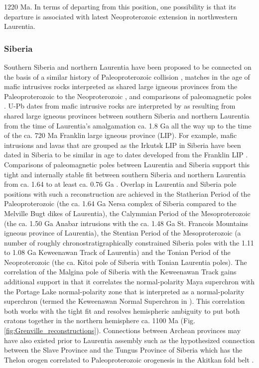 \documentclass[twocolumn, switch]{article} %
\begin{document}
1220 Ma. In terms of departing from this position, one possibility is that its departure is associated with latest Neoproterozoic extension in northwestern Laurentia.

\subsubsection{Siberia}

Southern Siberia and northern Laurentia have been proposed to be connected on the basis of a similar history of Paleoproterozoic collision \citep{Rainbird1998a}, matches in the age of mafic intrusives rocks interpreted as shared large igneous provinces from the Paleoproterozoic to the Neoproterozoic \citep{Ernst2016a}, and comparisons of paleomagnetic poles \citep{Evans2011a, Evans2016b}. U-Pb dates from mafic intrusive rocks are interpreted by \cite{Ernst2016a} as resulting from shared large igneous provinces between southern Siberia and northern Laurentia from the time of Laurentia's amalgamation ca. 1.8 Ga all the way up to the time of the ca. 720 Ma Franklin large igneous province (LIP). For example, mafic intrusions and lavas that are grouped as the Irkutsk LIP in Siberia have been dated in Siberia to be similar in age to dates developed from the Franklin LIP \citep{Denyszyn2009a, Ernst2016a}. Comparisons of paleomagnetic poles between Laurentia and Siberia support this tight and internally stable fit between southern Siberia and northern Laurentia from ca. 1.64 to at least ca. 0.76 Ga  \citep{Evans2016b}. Overlap in Laurentia and Siberia pole positions with such a reconstruction are achieved in the Statherian Period of the Paleoproterozoic (the ca. 1.64 Ga Nersa complex of Siberia compared to the Melville Bugt dikes of Laurentia), the Calymmian Period of the Mesoproterozoic (the ca. 1.50 Ga Anabar intrusions with the ca. 1.48 Ga St. Francois Mountains igneous province of Laurentia), the Stentian Period of the Mesoproterozoic (a number of roughly chronostratigraphically constrained Siberia poles with the 1.11 to 1.08 Ga Keweenawan Track of Laurentia) and the Tonian Period of the Neoproterozoic (the ca.  Kitoi pole of Siberia with Tonian Laurentia poles).  The correlation of the Malgina pole of Siberia with the Keweenawan Track gains additional support in that it correlates the normal-polarity Maya superchron \citep{Gallet2012a} with the Portage Lake normal-polarity zone \citep{Swanson-Hysell2019a} that is interpreted as a normal-polarity superchron (termed the Keweenawan Normal Superchron in \citealp{Driscoll2016a}). This correlation both works with the tight fit and resolves hemispheric ambiguity to put both cratons together in the northern hemisphere ca. 1100 Ma (Fig. \ref{fig:Grenville_reconstructions}). Connections between Archean provinces may have also existed prior to Laurentia assembly such as the hypothesized connection between the Slave Province and the Tungus Province of Siberia which has the Thelon orogen correlated to Paleoproterozoic orogenesis in the Akitkan fold belt \citep{Condie1994a, Rainbird1998a, Evans2011a}.
\end{document}
